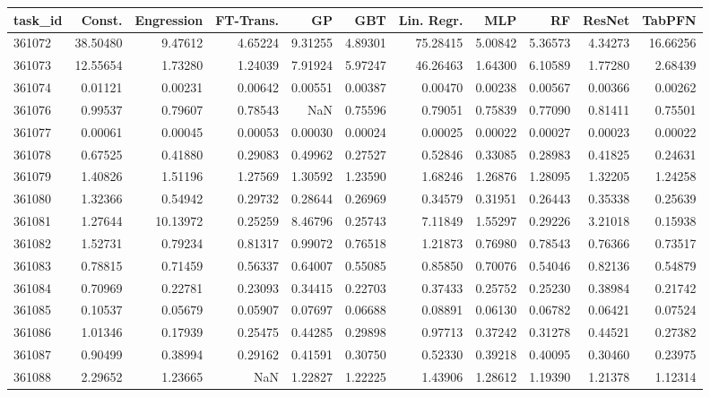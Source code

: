 \begin{tabular}{lrrrrrrrrrr}
\toprule
task\_id & Const. & Engression & FT-Trans. & GP & GBT & Lin. Regr. & MLP & RF & ResNet & TabPFN \\
\midrule
361072 & 38.50480 & 9.47612 & 4.65224 & 9.31255 & 4.89301 & 75.28415 & 5.00842 & 5.36573 & 4.34273 & 16.66256 \\
361073 & 12.55654 & 1.73280 & 1.24039 & 7.91924 & 5.97247 & 46.26463 & 1.64300 & 6.10589 & 1.77280 & 2.68439 \\
361074 & 0.01121 & 0.00231 & 0.00642 & 0.00551 & 0.00387 & 0.00470 & 0.00238 & 0.00567 & 0.00366 & 0.00262 \\
361076 & 0.99537 & 0.79607 & 0.78543 & NaN & 0.75596 & 0.79051 & 0.75839 & 0.77090 & 0.81411 & 0.75501 \\
361077 & 0.00061 & 0.00045 & 0.00053 & 0.00030 & 0.00024 & 0.00025 & 0.00022 & 0.00027 & 0.00023 & 0.00022 \\
361078 & 0.67525 & 0.41880 & 0.29083 & 0.49962 & 0.27527 & 0.52846 & 0.33085 & 0.28983 & 0.41825 & 0.24631 \\
361079 & 1.40826 & 1.51196 & 1.27569 & 1.30592 & 1.23590 & 1.68246 & 1.26876 & 1.28095 & 1.32205 & 1.24258 \\
361080 & 1.32366 & 0.54942 & 0.29732 & 0.28644 & 0.26969 & 0.34579 & 0.31951 & 0.26443 & 0.35338 & 0.25639 \\
361081 & 1.27644 & 10.13972 & 0.25259 & 8.46796 & 0.25743 & 7.11849 & 1.55297 & 0.29226 & 3.21018 & 0.15938 \\
361082 & 1.52731 & 0.79234 & 0.81317 & 0.99072 & 0.76518 & 1.21873 & 0.76980 & 0.78543 & 0.76366 & 0.73517 \\
361083 & 0.78815 & 0.71459 & 0.56337 & 0.64007 & 0.55085 & 0.85850 & 0.70076 & 0.54046 & 0.82136 & 0.54879 \\
361084 & 0.70969 & 0.22781 & 0.23093 & 0.34415 & 0.22703 & 0.37433 & 0.25752 & 0.25230 & 0.38984 & 0.21742 \\
361085 & 0.10537 & 0.05679 & 0.05907 & 0.07697 & 0.06688 & 0.08891 & 0.06130 & 0.06782 & 0.06421 & 0.07524 \\
361086 & 1.01346 & 0.17939 & 0.25475 & 0.44285 & 0.29898 & 0.97713 & 0.37242 & 0.31278 & 0.44521 & 0.27382 \\
361087 & 0.90499 & 0.38994 & 0.29162 & 0.41591 & 0.30750 & 0.52330 & 0.39218 & 0.40095 & 0.30460 & 0.23975 \\
361088 & 2.29652 & 1.23665 & NaN & 1.22827 & 1.22225 & 1.43906 & 1.28612 & 1.19390 & 1.21378 & 1.12314 \\

\end{tabular}
